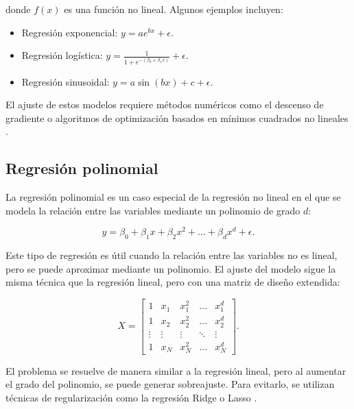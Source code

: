 \begin{itemize}
		donde \( f(x) \) es una función no lineal. Algunos ejemplos incluyen:
		
		\begin{itemize}
			\item Regresión exponencial: \( y = a e^{bx} + \epsilon \).
			\item Regresión logística: \( y = \frac{1}{1 + e^{-(\beta_0 + \beta_1 x)}} + \epsilon \).
			\item Regresión sinusoidal: \( y = a \sin(bx) + c + \epsilon \).
		\end{itemize}
		
		El ajuste de estos modelos requiere métodos numéricos como el descenso de gradiente o algoritmos de optimización basados en mínimos cuadrados no lineales \cite{bishop2006pattern}.
		
		\subsection{Regresión polinomial}
		
		La regresión polinomial es un caso especial de la regresión no lineal en el que se modela la relación entre las variables mediante un polinomio de grado \( d \):
		
		\begin{equation}
			y = \beta_0 + \beta_1 x + \beta_2 x^2 + \dots + \beta_d x^d + \epsilon.
		\end{equation}
		
		Este tipo de regresión es útil cuando la relación entre las variables no es lineal, pero se puede aproximar mediante un polinomio. El ajuste del modelo sigue la misma técnica que la regresión lineal, pero con una matriz de diseño extendida:
		
		\begin{equation}
			X =
			\begin{bmatrix}
				1 & x_1 & x_1^2 & \dots & x_1^d \\
				1 & x_2 & x_2^2 & \dots & x_2^d \\
				\vdots & \vdots & \vdots & \ddots & \vdots \\
				1 & x_N & x_N^2 & \dots & x_N^d
			\end{bmatrix}.
		\end{equation}
		
		El problema se resuelve de manera similar a la regresión lineal, pero al aumentar el grado del polinomio, se puede generar sobreajuste. Para evitarlo, se utilizan técnicas de regularización como la regresión Ridge o Lasso \cite{friedman2001elements}.
		

\end{itemize}
